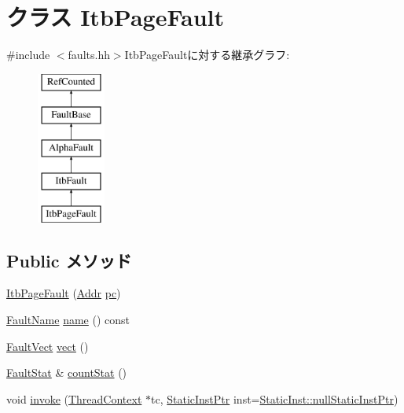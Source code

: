 \hypertarget{classAlphaISA_1_1ItbPageFault}{
\section{クラス ItbPageFault}
\label{classAlphaISA_1_1ItbPageFault}
}


{\ttfamily \#include $<$faults.hh$>$}ItbPageFaultに対する継承グラフ:\begin{figure}[H]
\begin{center}
\leavevmode
\includegraphics[height=5cm]{classAlphaISA_1_1ItbPageFault}
\end{center}
\end{figure}
\subsection*{Public メソッド}
\begin{DoxyCompactItemize}
\item 
\hyperlink{classAlphaISA_1_1ItbPageFault_a47740fcdb72d57c57dcb39b14a4e47db}{ItbPageFault} (\hyperlink{classm5_1_1params_1_1Addr}{Addr} \hyperlink{classAlphaISA_1_1ItbFault_afed6bf9f08aaa7445161a391a719b7e4}{pc})
\item 
\hyperlink{sim_2faults_8hh_abb196df64725e5c2568c900cf130d8d7}{FaultName} \hyperlink{classAlphaISA_1_1ItbPageFault_a73adb23259baf912a81683a9790a303f}{name} () const 
\item 
\hyperlink{classm5_1_1params_1_1Addr}{FaultVect} \hyperlink{classAlphaISA_1_1ItbPageFault_ae15c5d7ab0162821b93d668d0b225198}{vect} ()
\item 
\hyperlink{classStats_1_1Scalar}{FaultStat} \& \hyperlink{classAlphaISA_1_1ItbPageFault_a6c79663c761ff57265459f7e3aefaf4c}{countStat} ()
\item 
void \hyperlink{classAlphaISA_1_1ItbPageFault_a2bd783b42262278d41157d428e1f8d6f}{invoke} (\hyperlink{classThreadContext}{ThreadContext} $\ast$tc, \hyperlink{classRefCountingPtr}{StaticInstPtr} inst=\hyperlink{classStaticInst_aa793d9793af735f09096369fb17567b6}{StaticInst::nullStaticInstPtr})
\end{DoxyCompactItemize}
